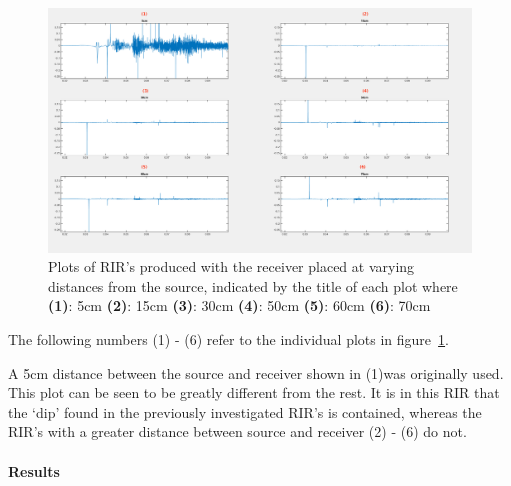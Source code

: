 \documentclass[../../main.tex]{subfiles}
\begin{document}
			\begin{figure}[H]
				\centerline{\includegraphics[scale = 0.3]{Sections/Implementation/Odeon/images/incorrectRIR/HeightTest_Edit.png}}
				\caption{Plots of \ac{RIR}'s produced with the receiver placed at varying distances from the source, indicated by the title of each plot where \textbf{(1)}: 5cm \textbf{(2)}: 15cm \textbf{(3)}: 30cm \textbf{(4)}: 50cm \textbf{(5)}: 60cm \textbf{(6)}: 70cm}
				\label{HeightTest}
			\end{figure}

			The following numbers (1) - (6) refer to the individual plots in figure~\ref{HeightTest}.

			A 5cm distance between the source and receiver shown in (1)\footnotemark[1] was originally used. This plot can be seen to be greatly different from the rest. It is in this \ac{RIR} that the `dip' found in the previously investigated \ac{RIR}'s is contained, whereas the \ac{RIR}'s with a greater distance between source and receiver (2) - (6) do not.


			\paragraph{Results}
			\label{odeon:results}
\end{document}
